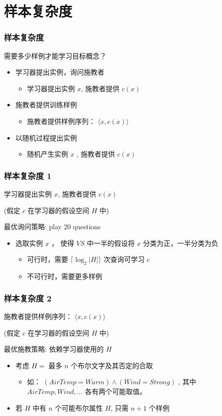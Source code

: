 \documentclass{beamer}
\begin{document}
\section{样本复杂度}
\label{sec-2}
\begin{frame}
\frametitle{样本复杂度}
\label{sec-2-1}

需要多少样例才能学习目标概念？

\begin{itemize}
\item 学习器提出实例，询问施教者
\begin{itemize}
\item 学习器提出实例 $x$, 施教者提供 $c(x)$
\end{itemize}
\item 施教者提供训练样例
\begin{itemize}
\item 施教者提供样例序列： $\langle x, c(x) \rangle$
\end{itemize}
\item 以随机过程提出实例
\begin{itemize}
\item 随机产生实例 $x$ , 施教者提供 $c(x)$
\end{itemize}
\end{itemize}
\end{frame}
\begin{frame}
\frametitle{样本复杂度 1}
\label{sec-2-2}


学习器提出实例 $x$, 施教者提供 $c(x)$

(假定 $c$ 在学习器的假设空间 $H$ 中)

最优询问策略: play 20 questions
\begin{itemize}
\item 选取实例 $x$ ， 使得 $VS$ 中一半的假设将 $x$ 分类为正，一半分类为负
\begin{itemize}
\item 可行时，需要 $\lceil \log_2 |H| \rceil$ 次查询可学习 $c$
\item 不可行时，需要更多样例
\end{itemize}
\end{itemize}
\end{frame}
\begin{frame}
\frametitle{样本复杂度 2}
\label{sec-2-3}


施教者提供样例序列： $\langle x, c(x) \rangle$

(假定 $c$ 在学习器的假设空间 $H$ 中)

最优施教策略: 依赖学习器使用的 $H$

\begin{itemize}
\item 考虑 $H=$ 最多 $n$ 个布尔文字及其否定的合取
\begin{itemize}
\item 如： $(AirTemp = Warm) \land (Wind = Strong)$ , 其中 $AirTemp, Wind,\ldots$ 各有两个可能取值。
\end{itemize}
\item 若 $H$ 中有 $n$ 个可能布尔属性 $H$, 只需 $n + 1$ 个样例
\end{itemize}
\end{frame}
\end{document}
